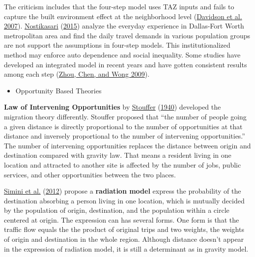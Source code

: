 \documentclass[
  12pt,
]{article}
\providecommand{\tightlist}{%
  \setlength{\itemsep}{0pt}\setlength{\parskip}{0pt}}
\begin{document}
The criticism includes that the four-step model uses TAZ inputs and fails to capture the built environment effect at the neighborhood level (\protect\hyperlink{ref-davidsonSynthesisFirstPractices2007}{Davidson et al. 2007}). \protect\hyperlink{ref-nostikasariRepresentationsEverydayTravel2015}{Nostikasari} (\protect\hyperlink{ref-nostikasariRepresentationsEverydayTravel2015}{2015}) analyze the everyday experience in Dallas-Fort Worth metropolitan area and find the daily travel demands in various population groups are not support the assumptions in four-step models. This institutionalized method may enforce auto dependence and social inequality. Some studies have developed an integrated model in recent years and have gotten consistent results among each step (\protect\hyperlink{ref-zhouAlternativeFormulationsCombined2009}{Zhou, Chen, and Wong 2009}).

\begin{itemize}
\tightlist
\item
  Opportunity Based Theories
\end{itemize}

\textbf{Law of Intervening Opportunities} by \protect\hyperlink{ref-stoufferInterveningOpportunitiesTheory1940}{Stouffer} (\protect\hyperlink{ref-stoufferInterveningOpportunitiesTheory1940}{1940}) developed the migration theory differently. Stouffer proposed that ``the number of people going a given distance is directly proportional to the number of opportunities at that distance and inversely proportional to the number of intervening opportunities.'' The number of intervening opportunities replaces the distance between origin and destination compared with gravity law. That means a resident living in one location and attracted to another site is affected by the number of jobs, public services, and other opportunities between the two places.

\protect\hyperlink{ref-siminiUniversalModelMobility2012}{Simini et al.} (\protect\hyperlink{ref-siminiUniversalModelMobility2012}{2012}) propose a \textbf{radiation model} express the probability of the destination absorbing a person living in one location, which is mutually decided by the population of origin, destination, and the population within a circle centered at origin. The expression can has several forms. One form is that the traffic flow equals the the product of original trips and two weights, the weights of origin and destination in the whole region. Although distance doesn't appear in the expression of radiation model, it is still a determinant as in gravity model.
\end{document}
